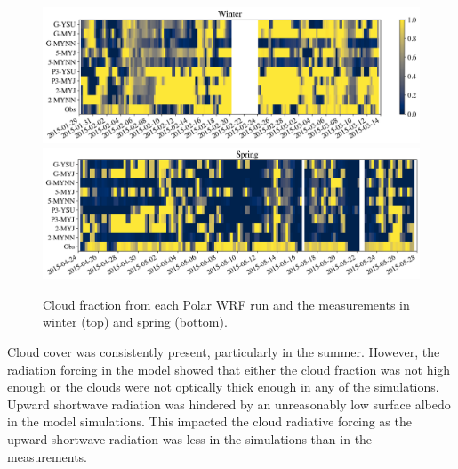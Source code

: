 \begin{figure}[H]
    \centering
    \includegraphics[width=1\linewidth]{figures/chapter3/WRF_CloudsWinter.png}
    \includegraphics[width=1\linewidth]{figures/chapter3/WRF_CloudsSpring.png}
    \caption[Polar WRF simulation cloud fraction]{Cloud fraction from each Polar WRF run and the measurements in winter (top) and spring (bottom).}
\label{fig:wrf_cloudfrac}
\end{figure}

Cloud cover was consistently present, particularly in the summer. However, the radiation forcing in the model showed that either the cloud fraction was not high enough or the clouds were not optically thick enough in any of the simulations. Upward shortwave radiation was hindered by an unreasonably low surface albedo in the model simulations. This impacted the cloud radiative forcing as the upward shortwave radiation was less in the simulations than in the measurements. 


